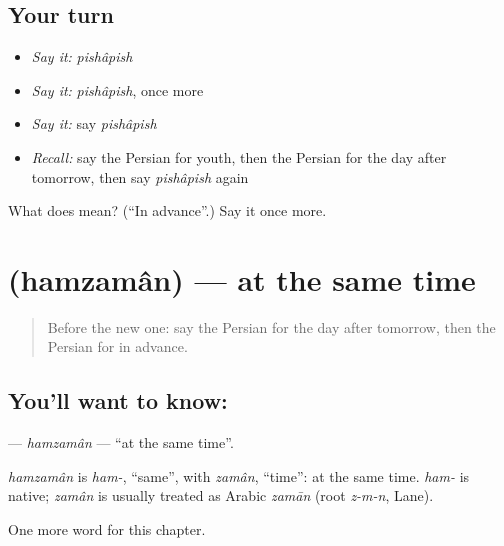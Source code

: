 \subsection*{Your turn}
\begin{itemize}
\raggedright
  \item \emph{Say it:} \emph{pishâpish}
  \item \emph{Say it:} \emph{pishâpish}, once more
  \item \emph{Say it:} say \emph{pishâpish}
  \item \emph{Recall:} say the Persian for youth, then the Persian for the day after tomorrow, then say \emph{pishâpish} again
\end{itemize}

\begin{tcolorbox}[breakable,colback=teal!4,colframe=teal!35!black,title={Before you move on}]
What does  mean? (\textquotedblleft{}In advance\textquotedblright{}.) Say it once more.
\end{tcolorbox}
\section[\texorpdfstring{\fa{همزمان} (hamzamân)}{همزمان (hamzamân)}]{ (hamzamân) — at the same time}

\label{lesson:FA-C265-hamzaman}



\begin{quote}
Before the new one: say the Persian for the day after tomorrow, then the Persian for in advance.
\end{quote}

\subsection*{You'll want to know: }
\textbf{} — \emph{hamzamân} — \textquotedblleft{}at the same time\textquotedblright{}.

\begin{cousinweb}
\emph{hamzamân} is \emph{ham-}, \textquotedblleft{}same\textquotedblright{}, with \emph{zamân}, \textquotedblleft{}time\textquotedblright{}: at the same time. \emph{ham-} is native; \emph{zamân} is usually treated as Arabic \emph{zamān} (root \emph{z-m-n}, Lane).
\end{cousinweb}

\begin{grammarlens}[title={What you've built}]
One more word for this chapter.
\end{grammarlens}

